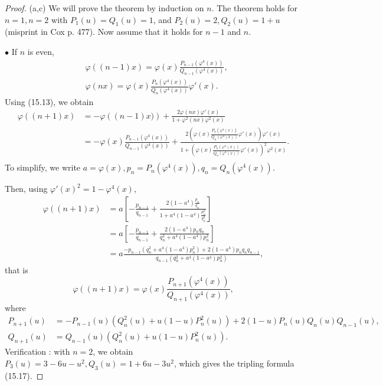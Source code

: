 \documentclass[11pt,a4paper]{article}
\begin{document}
\begin{proof} 
\item[(a,c)] We will prove the theorem by induction on $n$. The theorem holds for $n=1,n=2$  with $P_1(u) =  Q_1(u) = 1$, and $P_2(u) = 2,Q_2(u) = 1+u$ (misprint in Cox p. 477).
Now assume that it holds for $n-1$ and $n$.

$\bullet$
If $n$ is even,
\begin{align*}
& \varphi((n-1)x) = \varphi(x)\frac{P_{n-1}\left(\varphi^4(x)\right)}{Q_{n-1}\left(\varphi^4(x)\right)}, \\
 &\varphi(nx) = \varphi(x)\frac{P_{n}\left(\varphi^4(x)\right)}{Q_{n}\left(\varphi^4(x)\right)} \varphi'(x).
  \end{align*}
 Using (15.13), we obtain
\begin{align*}
\varphi\left((n+1)x\right) &= - \varphi\left( (n-1)x) \right) + \frac{2 \varphi(nx) \varphi'(x)}{1+\varphi^2(nx) \varphi^2(x)}\\
&=- \varphi(x) \frac{P_{n-1}\left(\varphi^4(x)\right)}{Q_{n-1}\left(\varphi^4(x)\right)} + \frac{2 \left(\varphi(x)\frac{P_{n}\left(\varphi^4(x)\right)}{Q_{n}\left(\varphi^4(x)\right)} \varphi'(x) \right) \varphi'(x)}{1+\left(\varphi(x)\frac{P_{n}\left(\varphi^4(x)\right)}{Q_{n}\left(\varphi^4(x)\right)} \varphi'(x) \right)^2 \varphi^2(x)}.\\
\end{align*}
To simplify, we write $a = \varphi(x), p_n = P_n(\varphi^4(x)), q_n = Q_n(\varphi^4(x))$. 

Then, using $\varphi'(x)^2 = 1 - \varphi^4(x)$,
\begin{align*}
\varphi\left((n+1)x\right) &= a \left[ -\frac{p_{n-1}}{q_{n-1}} + \frac{2 (1-a^4)\frac{p_n}{q_n} }{1 + a^4(1-a^4) \frac{p_n^2}{q_n^2}} \right] \\
&=a \left[  -\frac{p_{n-1}}{q_{n-1}} + \frac{2(1-a^4)p_nq_n}{q_n^2+a^4(1-a^4)p_n^2}\right] \\
&=a \frac {-p_{n-1}(q_n^2 + a^4(1-a^4) p_n^2) + 2(1-a^4) p_nq_nq_{n-1}}{q_{n-1}(q_n^2 + a^4(1-a^4)p_n^2)},
\end{align*}
that is
$$\varphi\left((n+1)x\right) = \varphi(x) \frac{P_{n+1}(\varphi^4(x))}{Q_{n+1}(\varphi^4(x))},$$
where
\begin{align*}
P_{n+1}(u) &= -P_{n-1}(u) (Q_n^2(u) + u(1-u) P_n^2(u)) + 2(1-u) P_n(u)Q_n(u) Q_{n-1}(u),\\
Q_{n+1}(u) &=Q_{n-1}(u)(Q_n^2(u) + u(1-u) P_n^2(u)).
\end{align*}
Verification : with $n = 2$, we obtain $P_3(u) = 3 - 6u - u^2, Q_3(u) = 1 + 6u - 3u^2$, which gives the tripling formula (15.17).


\end{proof}
\end{document}
